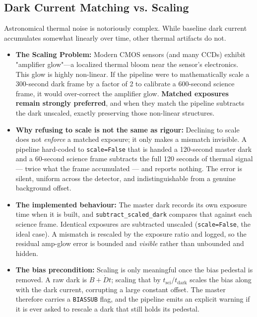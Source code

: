 \documentclass[11pt,a4paper]{article}
\begin{document}
\subsection{Dark Current Matching vs. Scaling}\label{app:dark}
Astronomical thermal noise is notoriously complex. While baseline dark current accumulates somewhat linearly over time, other thermal artifacts do not.
\begin{itemize}[leftmargin=*]
    \item \textbf{The Scaling Problem:} Modern CMOS sensors (and many CCDs) exhibit "amplifier glow"---a localized thermal bloom near the sensor's electronics. This glow is highly non-linear. If the pipeline were to mathematically scale a 300-second dark frame by a factor of 2 to calibrate a 600-second science frame, it would over-correct the amplifier glow. \textbf{Matched exposures remain strongly preferred}, and when they match the pipeline subtracts the dark unscaled, exactly preserving those non-linear structures.
    \item \textbf{Why refusing to scale is not the same as rigour:} Declining to scale does not \emph{enforce} a matched exposure; it only makes a mismatch invisible. A pipeline hard-coded to \texttt{scale=False} that is handed a 120-second master dark and a 60-second science frame subtracts the full 120 seconds of thermal signal --- twice what the frame accumulated --- and reports nothing. The error is silent, uniform across the detector, and indistinguishable from a genuine background offset.
    \item \textbf{The implemented behaviour:} The master dark records its own exposure time when it is built, and \texttt{subtract\_scaled\_dark} compares that against each science frame. Identical exposures are subtracted unscaled (\texttt{scale=False}, the ideal case). A mismatch is rescaled by the exposure ratio and logged, so the residual amp-glow error is bounded and \emph{visible} rather than unbounded and hidden.
    \item \textbf{The bias precondition:} Scaling is only meaningful once the bias pedestal is removed. A raw dark is $B + \dot{D}t$; scaling that by $t_{\mathrm{sci}}/t_{\mathrm{dark}}$ scales the bias along with the dark current, corrupting a large constant offset. The master therefore carries a \texttt{BIASSUB} flag, and the pipeline emits an explicit warning if it is ever asked to rescale a dark that still holds its pedestal.
\end{itemize}
\end{document}
